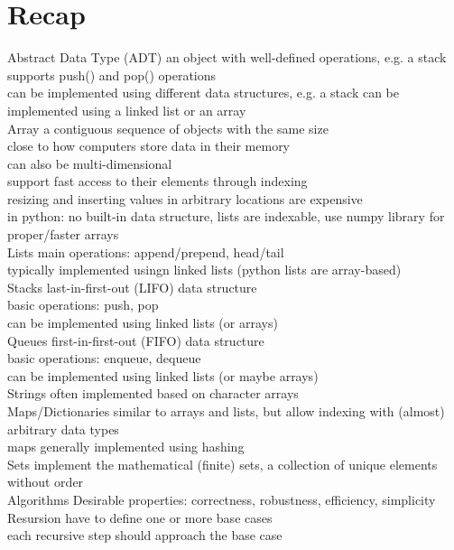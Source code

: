 \section{Recap}
\scriptsize{Abstract Data Type (ADT)} {\tiny an object with well-defined operations, e.g. a stack supports push() and pop() operations \\
can be implemented using different data structures, e.g. a stack can be implemented using a linked list or an array}\\
\scriptsize{Array} {\tiny a contiguous sequence of
objects with the same size \\
close to how computers store data in their memory\\
can also be multi-dimensional\\
support fast access to their elements through indexing\\
resizing and inserting values in arbitrary locations are expensive\\
in python: no built-in data structure, lists are indexable, use numpy library for proper/faster arrays
}\\
\scriptsize{Lists}
{\tiny main operations: append/prepend, head/tail\\
typically implemented usingn linked lists (python lists are array-based)
}\\
\scriptsize{Stacks} {\tiny last-in-first-out (LIFO) data structure\\
basic operations: push, pop\\
can be implemented using linked lists (or arrays)
}\\
\scriptsize{Queues} {\tiny first-in-first-out (FIFO) data structure\\
basic operations: enqueue, dequeue\\
can be implemented using linked lists (or maybe arrays)
}\\
\scriptsize{Strings} {\tiny often implemented based on character arrays }\\
\scriptsize{Maps/Dictionaries} {\tiny similar to arrays and lists, but allow indexing with (almost) arbitrary data types\\
maps generally implemented using hashing }\\
\scriptsize{Sets} {\tiny implement the mathematical (finite) sets, a collection of unique elements without order}\\
\scriptsize{Algorithms}
{\tiny Desirable properties: correctness, robustness, efficiency, simplicity}\\
\scriptsize{Resursion}
{\tiny have to define one or more base cases\\
each recursive step should approach the base case}